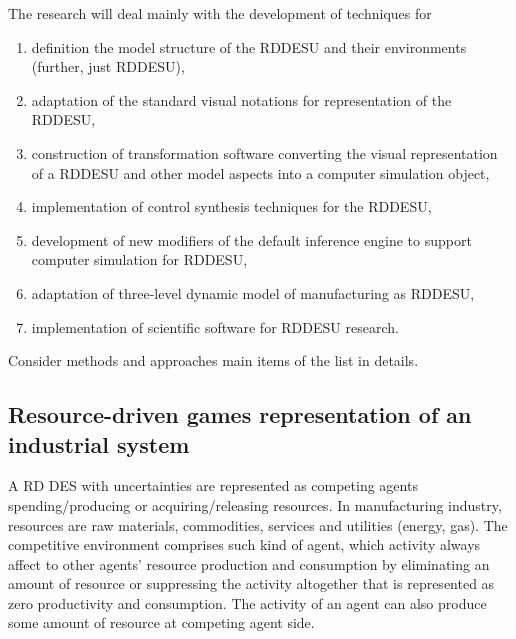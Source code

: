 \documentclass[conference]{IEEEtran}
\begin{document}

The research will deal mainly with the development of techniques for
\begin{enumerate}
\item definition the model structure of the RDDESU and their environments (further, just RDDESU),
\item adaptation of the standard visual notations for representation of the RDDESU,
\item construction of transformation software converting the visual representation of a RDDESU and other model aspects into a computer simulation object,
\item implementation of control synthesis techniques for the RDDESU,
\item development of new modifiers of the default inference engine to support computer simulation for RDDESU,
\item adaptation of three-level dynamic model of manufacturing as RDDESU,
\item implementation of scientific software for RDDESU research.
\end{enumerate}

Consider methods and approaches main items of the list in details.

\subsection{Resource-driven games representation of an industrial system}
\label{sec:sub-rbg}

A RD DES with uncertainties are represented as competing agents spending/producing or acquiring/releasing resources. In manufacturing industry, resources are raw materials, commodities, services and utilities (energy, gas). The competitive environment comprises such kind of agent, which activity always affect to other agents' resource production and consumption by eliminating an amount of resource or suppressing the activity altogether that is represented as zero productivity and consumption. The activity of an agent can also produce some amount of resource at competing agent side.
\end{document}
